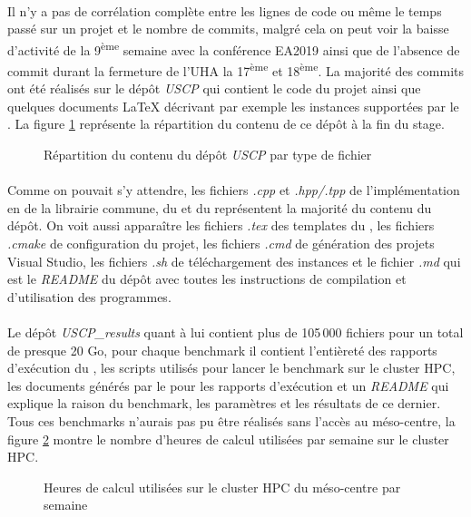 \documentclass[a4paper,11pt,twoside,french,report]{../common/simplem}
\begin{document}
			\paragraph*{}
				Il n'y a pas de corrélation complète entre les lignes de code ou même le temps passé sur un projet et le nombre de commits, malgré cela on peut voir la baisse d'activité de la 9\textsuperscript{ème} semaine avec la conférence \acrshort{EA2019} ainsi que de l'absence de commit durant la fermeture de l'\gls{UHA} la 17\textsuperscript{ème} et 18\textsuperscript{ème}. La majorité des commits ont été réalisés sur le dépôt \textit{USCP} qui contient le code du projet ainsi que quelques documents \LaTeX{} décrivant par exemple les instances supportées par le \solver{}. La figure \ref{fig:USCP_repository_files_stats} représente la répartition du contenu de ce dépôt à la fin du stage.
			\begin{figure}[H]
				\centering%
				\caption{Répartition du contenu du dépôt \textit{USCP} par type de fichier}%
				\label{fig:USCP_repository_files_stats}%
			\end{figure}
			\paragraph*{}
				Comme on pouvait s'y attendre, les fichiers \textit{.cpp} et \textit{.hpp/.tpp} de l'implémentation en \Cpp{} de la librairie commune, du \printer{} et du \solver{} représentent la majorité du contenu du dépôt. On voit aussi apparaître les fichiers \textit{.tex} des templates du \printer{}, les fichiers \textit{.cmake} de configuration du projet, les fichiers \textit{.cmd} de génération des projets Visual Studio, les fichiers \textit{.sh} de téléchargement des instances et le fichier \textit{.md} qui est le \textit{README} du dépôt avec toutes les instructions de compilation et d'utilisation des programmes.
			\paragraph*{}
				Le dépôt \textit{USCP\_results} quant à lui contient plus de 105\,000 fichiers pour un total de presque 20 Go, pour chaque benchmark il contient l'entièreté des rapports d'exécution du \solver{}, les scripts utilisés pour lancer le benchmark sur le cluster \gls{HPC}, les documents générés par le \printer{} pour les rapports d'exécution et un \textit{README} qui explique la raison du benchmark, les paramètres et les résultats de ce dernier. Tous ces benchmarks n'aurais pas pu être réalisés sans l'accès au méso-centre, la figure \ref{fig:hpc_usage} montre le nombre d'heures de calcul utilisées par semaine sur le cluster \gls{HPC}.
			\begin{figure}[H]
				\centering%
				\caption{Heures de calcul utilisées sur le cluster \acrshort{HPC} du méso-centre par semaine}%
				\label{fig:hpc_usage}%
			\end{figure}
\end{document}
